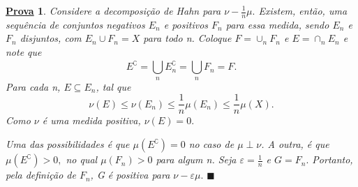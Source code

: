 \documentclass{article}
\newtheorem*{proof*}{\underline{Prova}}
\renewcommand\qedsymbol{$\blacksquare$}
\begin{document}
\begin{proof*}
  Considere a decomposição de Hahn para \(\nu -\frac{1}{n}\mu .\) Existem, então, uma sequência de conjuntos negativos \(E_{n}\) e positivos \(F_{n}\) para essa medida, sendo \(E_{n}\) e \(F_{n}\) disjuntos, com \(E_{n}\cup F_{n} = X\) para todo n. 
Coloque \(F = \cup _n F_{n}\) e \(E = \cap_{n} E_{n}\) e note que 
  \[
    E ^{\complement} = \bigcup_{n}^{}E_{n}^{\complement} = \bigcup_{n}^{}F_{n} = F.
  \]
Para cada n, \(E\subseteq E_{n}\), tal que 
  \[
    \nu (E) \leq \nu (E_{n}) \leq \frac{1}{n}\mu (E_{n})\leq \frac{1}{n}\mu (X).
  \]
Como \(\nu \) é uma medida positiva, \(\nu (E) = 0.\) 

Uma das possibilidades é que \(\mu (E ^{\complement}) = 0\) no caso de \(\mu \perp \nu \). A outra, é que \(\mu (E ^{\complement})>0,\) no qual \(\mu (F_{n}) > 0\) para algum n. Seja \(\varepsilon  = \frac{1}{n}\) e \(G = F_{n}.\) Portanto, 
pela definição de \(F_{n}\), G é positiva para \(\nu - \varepsilon \mu .\) \qedsymbol
\end{proof*}
\end{document}
